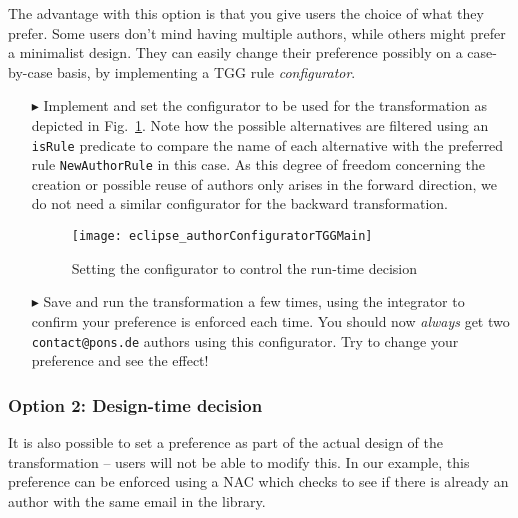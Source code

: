 The advantage with this option is that you give users the choice of what they prefer. 
Some users don't mind having multiple authors, while others might prefer a minimalist design. 
They can easily change their preference possibly on a case-by-case basis, by implementing a TGG rule \emph{configurator}.

\begin{itemize}

\item[$\blacktriangleright$] Implement and set the configurator to be used for the transformation as depicted in Fig.~\ref{eclipse:editTGGMain}.
Note how the possible alternatives are filtered using an \texttt{isRule} predicate to compare the name of each alternative with the preferred rule \texttt{NewAuthorRule} in this case.
As this degree of freedom concerning the creation or possible reuse of authors only arises in the forward direction, we do not need a similar configurator for the backward transformation.

\begin{figure}[htbp]
\begin{center}
  \texttt{[image: eclipse\_authorConfiguratorTGGMain]}
  \caption{Setting the configurator to control the run-time decision}
  \label{eclipse:editTGGMain}
\end{center}
\end{figure}

\item[$\blacktriangleright$] Save and run the transformation a few times, using the integrator to confirm your preference is enforced each time.
You should now \emph{always} get two \texttt{contact@pons.de} authors using this configurator.
Try to change your preference and see the effect!

\end{itemize}

\subsubsection{Option 2: Design-time decision}

It is also possible to set a preference as part of the actual design of the transformation -- users will not be able to modify this. In our example, this
preference can be enforced using a NAC which checks to see if there is already an author with the same email in the library.

